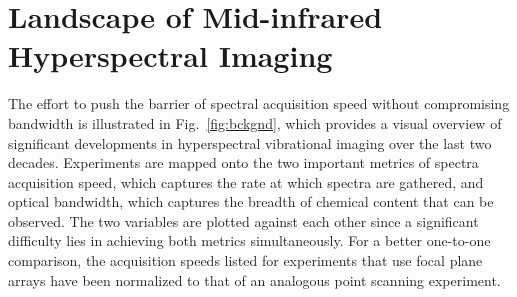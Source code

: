 \documentclass[aip,reprint]{revtex4-1}
\begin{document}
\section{Landscape of Mid-infrared Hyperspectral Imaging}
The effort to push the barrier of spectral acquisition speed without compromising bandwidth is illustrated in \mbox{Fig. \ref{fig:bckgnd}}, which provides a visual overview of significant developments in hyperspectral vibrational imaging over the last two decades. Experiments are mapped onto the two important metrics of spectra acquisition speed, which captures the rate at which spectra are gathered, and optical bandwidth, which captures the breadth of chemical content that can be observed. The two variables are plotted against each other since a significant difficulty lies in achieving both metrics simultaneously. For a better one-to-one comparison, the acquisition speeds listed for experiments that use focal plane arrays have been normalized to that of an analogous point scanning experiment.

\end{document}
